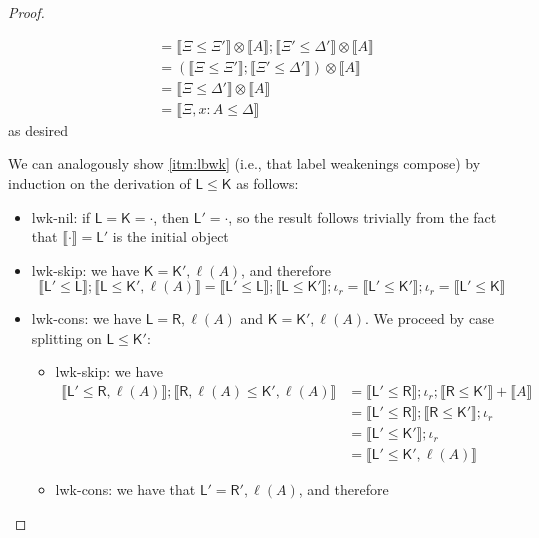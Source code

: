 \documentclass[acmsmall,screen,review]{acmart}
\newcommand{\mb}[1]{\ensuremath{\mathbf{#1}}}
\newcommand{\ms}[1]{\ensuremath{\mathsf{#1}}}
\newcommand{\bhyp}[2]{#1 : #2}
\newcommand{\brle}[1]{{\textsf{#1}}}
\newcommand{\dnt}[1]{\llbracket{#1}\rrbracket}
\begin{document}
\begin{proof}
\begin{itemize}
\begin{itemize}
\begin{equation}
\begin{aligned}
        &= \dnt{\Xi \leq \Xi'} \otimes \dnt{A} ; \dnt{\Xi' \leq \Delta'} \otimes \dnt{A} \\
        &= (\dnt{\Xi \leq \Xi'} ; \dnt{\Xi' \leq \Delta'}) \otimes \dnt{A} \\
        &= \dnt{\Xi \leq \Delta'} \otimes \dnt{A} \\
        &= \dnt{\Xi, \bhyp{x}{A} \leq \Delta}
        \end{aligned}
      \end{equation}
      as desired
    \end{itemize}
  \end{itemize}
  We can analogously show \ref{itm:lbwk} (i.e., that label weakenings compose) by induction on the
  derivation of $\ms{L} \leq \ms{K}$ as follows:
  \begin{itemize}
    \item \brle{lwk-nil}: if $\ms{L} = \ms{K} = \cdot$, then $\ms{L}' = \cdot$, so the result
    follows trivially from the fact that $\dnt{\cdot} = \mb{\ms{L}'}$ is the initial object
    \item \brle{lwk-skip}: we have $\ms{K} = \ms{K}', \ell(A)$, and therefore
    \begin{equation}
      \dnt{\ms{L}' \leq \ms{L}} ; \dnt{\ms{L} \leq \ms{K}', \ell(A)}
      = \dnt{\ms{L}' \leq \ms{L}} ; \dnt{\ms{L} \leq \ms{K}'} ; \iota_r
      = \dnt{\ms{L}' \leq \ms{K}'} ; \iota_r
      = \dnt{\ms{L}' \leq \ms{K}}
    \end{equation}
    \item \brle{lwk-cons}: we have $\ms{L} = \ms{R}, \ell(A)$ and $\ms{K} = \ms{K}', \ell(A)$. We
    proceed by case splitting on $\ms{L} \leq \ms{K}'$:
    \begin{itemize}
      \item \brle{lwk-skip}: we have
      \begin{equation}
        \begin{aligned}
        \dnt{\ms{L}' \leq \ms{R}, \ell(A)} ; \dnt{\ms{R}, \ell(A) \leq \ms{K}', \ell(A)}
        & = \dnt{\ms{L}' \leq \ms{R}} ; \iota_r ; \dnt{\ms{R} \leq \ms{K}'} + \dnt{A} \\
        & = \dnt{\ms{L}' \leq \ms{R}} ; \dnt{\ms{R} \leq \ms{K}'} ; \iota_r \\
        & = \dnt{\ms{L}' \leq \ms{K}'} ; \iota_r \\
        & = \dnt{\ms{L}' \leq \ms{K}', \ell(A)}
        \end{aligned}
      \end{equation}
      \item \brle{lwk-cons}: we have that $\ms{L}' = \ms{R}', \ell(A)$, and therefore

\end{itemize}
\end{itemize}
\end{proof}
\end{document}
